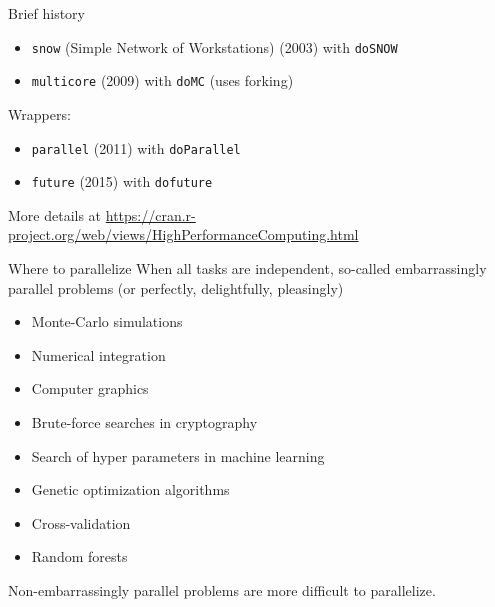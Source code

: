 \documentclass[
  ignorenonframetext,
  usenames,
  dvipsnames]{beamer}
\providecommand{\tightlist}{%
  \setlength{\itemsep}{0pt}\setlength{\parskip}{0pt}}
\begin{document}
\begin{frame}[fragile]{Brief history}
\protect\hypertarget{brief-history}{}
\begin{itemize}
\tightlist
\item
  \texttt{snow} (Simple Network of Workstations) (2003) with
  \texttt{doSNOW}
\item
  \texttt{multicore} (2009) with \texttt{doMC} (uses forking)
\end{itemize}

Wrappers:

\begin{itemize}
\tightlist
\item
  \texttt{parallel} (2011) with \texttt{doParallel}
\item
  \texttt{future} (2015) with \texttt{dofuture}
\end{itemize}

More details at
\url{https://cran.r-project.org/web/views/HighPerformanceComputing.html}
\end{frame}

\begin{frame}{Where to parallelize}
\protect\hypertarget{where-to-parallelize}{}
When all tasks are independent, so-called embarrassingly parallel
problems (or perfectly, delightfully, pleasingly)

\begin{itemize}
\tightlist
\item
  Monte-Carlo simulations
\item
  Numerical integration
\item
  Computer graphics
\item
  Brute-force searches in cryptography
\item
  Search of hyper parameters in machine learning
\item
  Genetic optimization algorithms
\item
  Cross-validation
\item
  Random forests
\end{itemize}

Non-embarrassingly parallel problems are more difficult to parallelize.
\end{frame}
\end{document}
